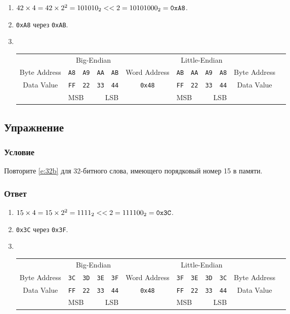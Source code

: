\documentclass[12pt]{article}
\newenvironment{e}[1][dummy label]{
    \subsection{Упражнение}\label{#1}
    \subsubsection*{Условие}
    }{
    \subsubsection*{Ответ}
}
\newcommand{\eref}[1]{\hyperref[{e:#1}]{\nameref*{e:#1} \ref*{e:#1}}}
\begin{document}
    \begin{enumerate}
        \item $42 \times 4 = 42 \times 2^2 = 101010_2 << 2 = 10101000_2 = \text{\texttt{0xA8}}$.
        \item \texttt{0xA8} через \texttt{0xAB}.
        \item ~
        \begin{table}[h!]
            \small
            \setlength\tabcolsep{4pt}
            \centering
            \begin{tabular}{cccccccccccc}
                & \multicolumn{4}{c}{Big-Endian} & & \multicolumn{4}{c}{Little-Endian} & \\
                Byte Address & \texttt{A8} & \texttt{A9} & \texttt{AA} & \texttt{AB} & Word Address & \texttt{AB} & \texttt{AA} & \texttt{A9} & \texttt{A8} & Byte Address \\
                Data Value & \texttt{FF} & \texttt{22} & \texttt{33} & \texttt{44} & \texttt{0x48} & \texttt{FF} & \texttt{22} & \texttt{33} & \texttt{44} & Data Value \\
                & \multicolumn{2}{l}{MSB} & \multicolumn{2}{r}{LSB} & & \multicolumn{2}{l}{MSB} & \multicolumn{2}{r}{LSB} & \\
            \end{tabular}
        \end{table}
    \end{enumerate}

    \begin{e}
        Повторите \eref{32b} для 32-битного слова, имеющего порядковый номер 15 в памяти.
    \end{e}

    \begin{enumerate}
        \item $15 \times 4 = 15 \times 2^2 = 1111_2 << 2 = 111100_2 = \text{\texttt{0x3C}}$.
        \item \texttt{0x3C} через \texttt{0x3F}.
        \item ~
        \begin{table}[h!]
            \small
            \setlength\tabcolsep{4pt}
            \centering
            \begin{tabular}{cccccccccccc}
                & \multicolumn{4}{c}{Big-Endian} & & \multicolumn{4}{c}{Little-Endian} & \\
                Byte Address & \texttt{3C} & \texttt{3D} & \texttt{3E} & \texttt{3F} & Word Address & \texttt{3F} & \texttt{3E} & \texttt{3D} & \texttt{3C} & Byte Address \\
                Data Value & \texttt{FF} & \texttt{22} & \texttt{33} & \texttt{44} & \texttt{0x48} & \texttt{FF} & \texttt{22} & \texttt{33} & \texttt{44} & Data Value \\
                & \multicolumn{2}{l}{MSB} & \multicolumn{2}{r}{LSB} & & \multicolumn{2}{l}{MSB} & \multicolumn{2}{r}{LSB} & \\
            \end{tabular}
        \end{table}
    \end{enumerate}
\end{document}
